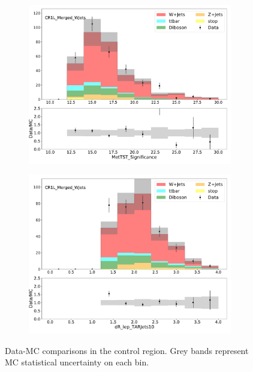 \begin{figure}[htbp]
\begin{subfigure}{0.49\textwidth}
     \caption{\mTAR}
     \end{subfigure}
    \begin{subfigure}{0.49\textwidth}
     \includegraphics[width = 0.98\textwidth]{Figures/4/datamc/CR1L_Merged_WJets/MetTST_Significance.pdf}
     \caption{\metsig}
     \end{subfigure}
    \begin{subfigure}{0.49\textwidth}
     \includegraphics[width = 0.98\textwidth]{Figures/4/datamc/CR1L_Merged_WJets/dR_lep_TARJets10.pdf}
     \caption{\drTARl}
     \end{subfigure}
     \caption{Data-MC comparisons in the \merged \wjets control region. Grey bands represent MC statistical uncertainty on each bin.}
     \label{fig:Data_MC_CRdR_merged}
  \end{figure}

